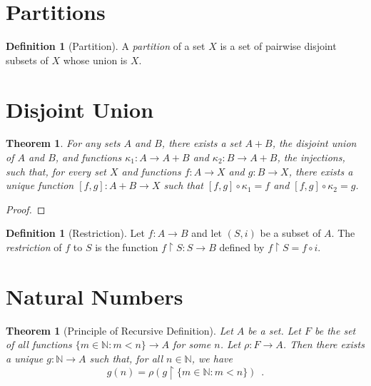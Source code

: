 \documentclass{book}
\newtheorem{thm}[ax]{Theorem}
\theoremstyle{definition}
\newtheorem{df}[ax]{Definition}
\begin{document}
\section{Partitions}

\begin{df}[Partition]
A \emph{partition} of a set $X$ is a set of pairwise disjoint subsets of $X$ whose union is $X$.
\end{df}

\section{Disjoint Union}

\begin{thm}
For any sets $A$ and $B$, there exists a set $A + B$, the \emph{disjoint union} of $A$ and $B$, and functions $\kappa_1 : A \rightarrow A + B$ and $\kappa_2 : B \rightarrow A + B$, the \emph{injections}, such that, for every set $X$ and functions $f : A \rightarrow X$ and $g : B \rightarrow X$, there exists a unique function $[f,g] : A + B \rightarrow X$ such that $[f,g] \circ \kappa_1 = f$ and $[f,g] \circ \kappa_2 = g$.
\end{thm}

\begin{proof}
\pf
{}
\end{proof}

\begin{df}[Restriction]
Let $f : A \rightarrow B$ and let $(S,i)$ be a subset of $A$. The \emph{restriction} of $f$ to $S$ is the function $f \restriction S : S \rightarrow B$ defined by $f \restriction S = f \circ i$.
\end{df}

\section{Natural Numbers}

\begin{thm}[Principle of Recursive Definition]
Let $A$ be a set. Let $F$ be the set of all functions $\{ m \in \mathbb{N} : m < n \} \rightarrow A$ for some $n$. Let $\rho : F \rightarrow A$. Then there exists a unique $g : \mathbb{N} \rightarrow A$ such that, for all $n \in \mathbb{N}$, we have
\[ g(n) = \rho(g \restriction \{ m \in \mathbb{N} : m < n \}) \enspace . \]
\end{thm}
\end{document}
